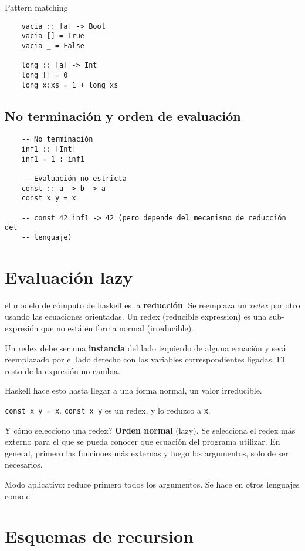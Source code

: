 \documentclass{report}
\theoremstyle{definition} %
\begin{document}
Pattern matching

\begin{verbatim}
    vacia :: [a] -> Bool
    vacia [] = True
    vacia _ = False

    long :: [a] -> Int
    long [] = 0
    long x:xs = 1 + long xs
\end{verbatim}

\subsection{No terminación y orden de evaluación}

\begin{verbatim}
    -- No terminación
    inf1 :: [Int]
    inf1 = 1 : inf1

    -- Evaluación no estricta
    const :: a -> b -> a
    const x y = x

    -- const 42 inf1 -> 42 (pero depende del mecanismo de reducción del
    -- lenguaje)
\end{verbatim}

\section{Evaluación lazy}

el modelo de cómputo de haskell es la \textbf{reducción}. Se reemplaza un
\textit{redex} por otro usando las ecuaciones orientadas. Un redex (reducible
expression) es una sub-expresión que no está en forma normal (irreducible).

Un redex debe ser una \textbf{instancia} del lado izquierdo de alguna ecuación y
será reemplazado por el lado derecho con las variables correspondientes ligadas.
El resto de la expresión no cambia.

Haskell hace esto hasta llegar a una forma normal, un valor irreducible.

\texttt{const x y = x}. \texttt{const x y} es un redex, y lo reduzco a
\texttt{x}.

Y cómo selecciono una redex? \textbf{Orden normal} (lazy). Se selecciona el
redex más externo para el que se pueda conocer que ecuación del programa
utilizar. En general, primero las funciones más externas y luego los argumentos,
solo de ser necesarios.

Modo aplicativo: reduce primero todos los argumentos. Se hace en otros lenguajes
como c.

\section{Esquemas de recursion}
\end{document}
